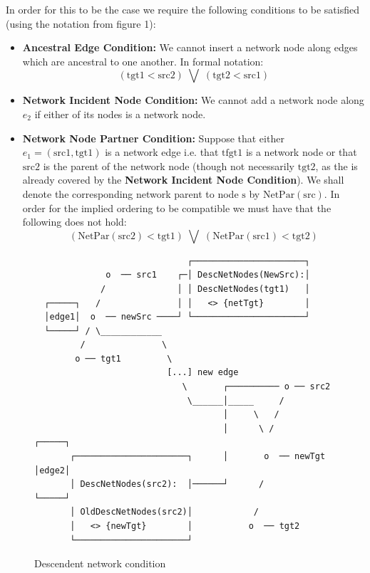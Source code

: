 \documentclass[11pt]{article}
\begin{document}
In order for this to be the case we require the following conditions to be satisfied (using the notation from figure 1):

\begin{itemize}

\item \textbf{Ancestral Edge Condition: } We cannot insert a network node along edges which are ancestral to one another. In formal notation:
  \[ (\mathrm{tgt1} < \mathrm{src2})\; \bigvee \; (\mathrm{tgt2} < \mathrm{src1}) \]

\item \textbf{Network Incident Node Condition: } We cannot add a network node along $e_2$ if either of its nodes is a network node.
 

\item \textbf{Network Node Partner Condition: }
Suppose that either $e_1=(\mathrm{src1}, \mathrm{tgt1})$ is a network edge i.e. that $\mathrm{tfgt1}$ is a network node or that $\mathrm{src2}$ is the parent of the network node (though not necessarily $\mathrm{tgt2}$, as the is already covered by the \textbf{Network Incident Node Condition}).
We shall denote the corresponding network parent to node $\mathrm{s}$ by $\mathrm{NetPar}(\mathrm{src})$. In order for the implied ordering to be compatible we must have that the following does not hold:
 \[ (\mathrm{NetPar(src2)} < \mathrm{tgt1})\; \bigvee \; (\mathrm{NetPar(src1)} < \mathrm{tgt2}) \]

\end{itemize}

\begin{figure}[H]
  \begin{verbatim}
                              ┌──────────────────────┐
              o  ── src1    ┌─│ DescNetNodes(NewSrc):│
             /              │ │ DescNetNodes(tgt1)   │
  ┌─────┐   /               │ │   <> {netTgt}        │
  │edge1│  o  ── newSrc ────┘ └──────────────────────┘
  └─────┘ / \____________    
         /               \
        o ── tgt1         \
                          [...] new edge
                             \       ┌────────── o ── src2
                              \______│_____     /
                                     │     \   /
                                     │      \ /           ┌─────┐
       ┌──────────────────────┐      │       o  ── newTgt │edge2│
       │ DescNetNodes(src2):  │──────┘      /             └─────┘
       │ OldDescNetNodes(src2)│            /
       │   <> {newTgt}        │           o  ── tgt2
       └──────────────────────┘ 
  \end{verbatim}
\caption{Descendent network condition}
\end{figure}
\end{document}
